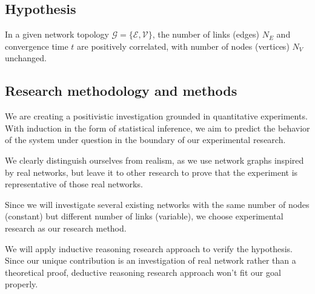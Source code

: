 \subsection{Hypothesis}
In a given network topology $\mathcal{G}=\{\mathcal{E}, \mathcal{V}\}$, the number of links (edges) $N_E$ and convergence time $t$ are positively correlated, with number of nodes (vertices) $N_V$ unchanged.

\subsection{Research methodology and methods}
We are creating a positivistic investigation grounded in quantitative experiments. With induction in the form of statistical inference, we aim to predict the behavior of the system under question in the boundary of our experimental research.

We clearly distinguish ourselves from realism, as we use network graphs inspired by real networks, but leave it to other research to prove that the experiment is representative of those real networks.

Since we will investigate several existing networks with the same number of nodes (constant) but different number of links (variable), we choose experimental research as our research method.

We will apply inductive reasoning research approach to verify the hypothesis. Since our unique contribution is an investigation of real network rather than a theoretical proof, deductive reasoning research approach won't fit our goal properly. 
